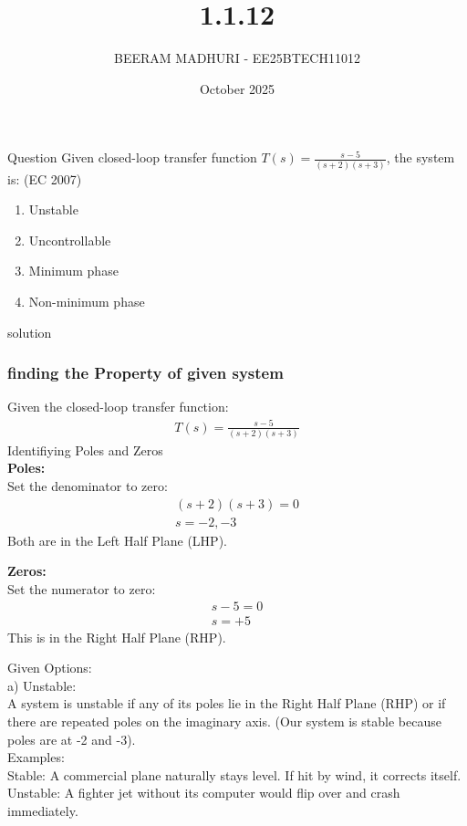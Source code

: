 \documentclass{beamer}
\title %
{1.1.12}
\date{October  2025}
\author %
{BEERAM MADHURI - EE25BTECH11012}
\begin{document}
\frame{\titlepage}
\begin{frame}{Question}
Given closed-loop transfer function $T(s) = \frac{s-5}{(s+2)(s+3)}$, the system is: \hfill (EC 2007)

\begin{enumerate}
    \item[a)] Unstable
    \item[b)] Uncontrollable
    \item[c)] Minimum phase
    \item[d)] Non-minimum phase
\end{enumerate}
\end{frame}

\begin{frame}{solution}
    \frametitle{finding the Property of given system}
Given the closed-loop transfer function:
\begin{align}
    T(s) = \frac{s - 5}{(s + 2)(s + 3)}
\end{align}
Identifiying Poles and Zeros\\
\textbf{Poles:}\\
Set the denominator to zero: \\
\begin{align}
    (s + 2)(s + 3) = 0\\
    s = -2 ,-3
\end{align}
 Both are in the Left Half Plane (LHP).
\end{frame}
\begin{frame}
    \textbf{Zeros:}\\
Set the numerator to zero: 
\begin{align}{}
    s - 5 = 0\\
    s = +5
\end{align}
This is in the Right Half Plane (RHP).
\end{frame}
\begin{frame}{}
    Given Options:\\
a) Unstable:\\
A system is unstable if any of its poles lie in the Right Half Plane (RHP) or if there are repeated poles on the imaginary axis. (Our system is stable because poles are at -2 and -3).\\

Examples:\\
Stable: A commercial plane naturally stays level. If hit by wind, it corrects itself.\\
Unstable: A fighter jet without its computer would flip over and crash immediately.\\
\end{frame}
\end{document}
